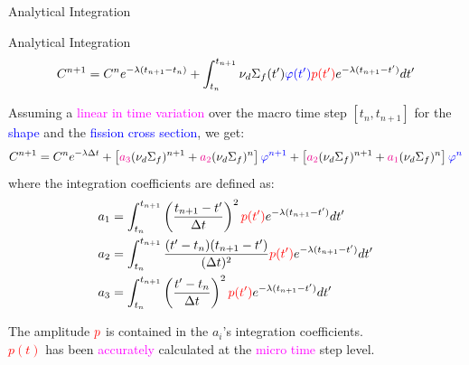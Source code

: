 \documentclass[8pt]{beamer}
\newcommand{\tcr}[1]{\textcolor{red}{#1}}
\newcommand{\tcb}[1]{\textcolor{blue}{#1}}
\newcommand{\tcm}[1]{\textcolor{magenta}{#1}}
\begin{document}
\begin{frame}{Analytical Integration}


\begin{block}{Analytical Integration}
\[
C^{n+1} =  C^n e^{-\lambda (t_{n+1} - t_n) }  + \int_{t_n}^{t_{n+1}} \nu_d\Sigma_f(t')\tcb{\varphi(t')} \tcr{p(t')} e^{-\lambda (t_{n+1}-t')}dt'
\]
\end{block}

\begin{block}{}
Assuming a \tcm{linear in time variation} over the macro time step $[t_n, t_{n+1}]$ for the \tcb{shape} and the \tcb{fission cross section}, we get:
\[
C^{n+1} = C^n e^{-\lambda \Delta t} 
+ \left[\tcm{a_3}(\nu_d\Sigma_f)^{n+1}+\tcm{a_2}(\nu_d\Sigma_f)^n\right]\tcb{\varphi^{n+1}}
+ \left[\tcm{a_2}(\nu_d\Sigma_f)^{n+1}+\tcm{a_1}(\nu_d\Sigma_f)^n\right]\tcb{\varphi^n    }
\]
where the integration coefficients are defined as:
\begin{align}
&a_1 = \int_{t_n}^{t_{n+1}}\left(\frac{t_{n+1}-t'}{\Delta t}\right)^2 \tcr{p(t')} e^{-\lambda(t_{n+1}-t')}dt' \notag \\
&a_2= \int_{t_n}^{t_{n+1}}\frac{(t'-t_n)(t_{n+1}-t')}{(\Delta t)^2}   \tcr{p(t')} e^{-\lambda(t_{n+1}-t')}dt'   \notag \\
&a_3 = \int_{t_n}^{t_{n+1}}\left(\frac{t'-t_n}{\Delta t}\right)^2     \tcr{p(t')} e^{-\lambda(t_{n+1}-t')}dt'     \notag 
\end{align}


The amplitude $\tcr{p}$ is contained in the $a_i$'s integration coefficients.\\
\tcr{$p(t)$} has been \tcm{accurately} calculated at the \tcm{micro time} step level.

\end{block}

\end{frame}

%
%
%
%
%
\end{document}
